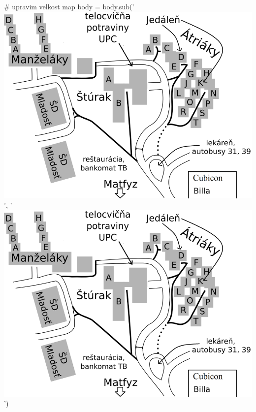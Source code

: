 \documentclass[11pt,slovak,twosides,openany]{scrbook}
\begin{document}
# upravim velkost map
body = body.sub('\includegraphics{images/mapa-horiz_w.png}', '\includegraphics[width=1\textwidth]{images/mapa-horiz_w.png}')
\end{document}
